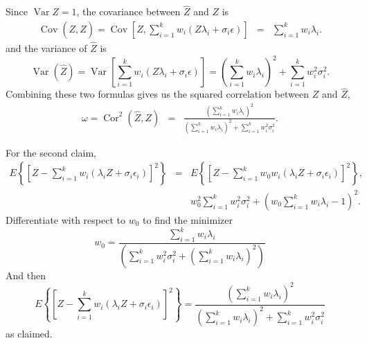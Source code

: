 \documentclass{article}
\makeatletter
\theoremstyle{plain}
\theoremstyle{plain}
\theoremstyle{definition}
\theoremstyle{remark}
\theoremstyle{definition}
\theoremstyle{plain}
\theoremstyle{plain}
\theoremstyle{definition}
\newenvironment{proof}[1][\protect\proofname]{\par
	\normalfont\topsep6\p@\@plus6\p@\relax
	\trivlist
	\itemindent\parindent
	\item[\hskip\labelsep\scshape #1]\ignorespaces
}{%
	\endtrivlist\@endpefalse
}
\providecommand{\proofname}{Proof}
\DeclareMathOperator{\Var}{Var}
\DeclareMathOperator{\Cor}{Cor}
\DeclareMathOperator{\Cov}{Cov}
\makeatother
\begin{document}
\begin{proof}[Proof of Proposition \ref{prop:reliability motivation}]\label{proof:reliability motivation}
Since $\Var Z=1$, the covariance between $\hat{Z}$ and $Z$
is
\begin{eqnarray*}
\Cov\left(Z,\hat{Z}\right)=\Cov\left[Z,\sum_{i=1}^{k}w_{i}\left(Z\lambda_{i}+\sigma_{i}\epsilon\right)\right] & = & \sum_{i=1}^{k}w_{i}\lambda_{i}.
\end{eqnarray*}
and the variance of $\hat{Z}$ is
\[
\Var\left(\hat{Z}\right)=\Var\left[\sum_{i=1}^{k}w_{i}\left(Z\lambda_{i}+\sigma_{i}\epsilon\right)\right]=\left(\sum_{i=1}^{k}w_{i}\lambda_{i}\right)^{2}+\sum_{i=1}^{k}w_{i}^{2}\sigma_{i}^{2}.
\]
Combining these two formulas gives us the squared correlation between
$Z$ and $\hat{Z}$,
\begin{eqnarray*}
\omega=\Cor^{2}\left(\hat{Z},Z\right) & = & \frac{\left(\sum_{i=1}^{k}w_{i}\lambda_{i}\right)^{2}}{\left(\sum_{i=1}^{k}w_{i}\lambda_{i}\right)^{2}+\sum_{i=1}^{k}w_{i}^{2}\sigma_{i}^{2}}.
\end{eqnarray*}

For the second claim,
\begin{eqnarray*}
E\left\{ \left[Z-\sum_{i=1}^{k}w_{i}\left(\lambda_{i}Z+\sigma_{i}\epsilon_{i}\right)\right]^{2}\right\}  & = & E\left\{ \left[Z-\sum_{i=1}^{k}w_{0}w_{i}\left(\lambda_{i}Z+\sigma_{i}\epsilon_{i}\right)\right]^{2}\right\} ,\\
 &  & w_{0}^{2}\sum_{i=1}^{k}w_{i}^{2}\sigma_{i}^{2}+\left(w_{0}\sum_{i=1}^{k}w_{i}\lambda_{i}-1\right)^{2}.
\end{eqnarray*}
Differentiate with respect to $w_{0}$ to find the minimizer
\[
w_{0}=\frac{\sum_{i=1}^{k}w_{i}\lambda_{i}}{\left(\sum_{i=1}^{k}w_{i}^{2}\sigma_{i}^{2}+\left(\sum_{i=1}^{k}w_{i}\lambda_{i}\right)^{2}\right)}
\]
And then
\[
E\left\{ \left[Z-\sum_{i=1}^{k}w_{i}\left(\lambda_{i}Z+\sigma_{i}\epsilon_{i}\right)\right]^{2}\right\} =\frac{\left(\sum_{i=1}^{k}w_{i}\lambda_{i}\right)^{2}}{\left(\sum_{i=1}^{k}w_{i}\lambda_{i}\right)^{2}+\sum_{i=1}^{k}w_{i}^{2}\sigma_{i}^{2}}
\]
as claimed.
\end{proof}
\end{document}

